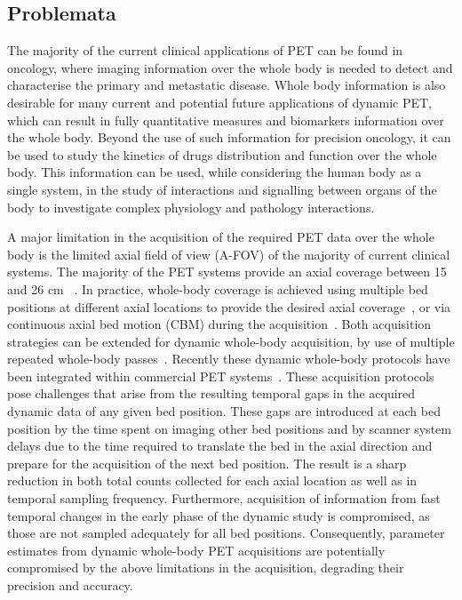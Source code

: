\subsection*{Problemata}
The majority of the current clinical applications of PET can be found in oncology, where imaging information over the whole body is needed to detect and characterise the primary and metastatic disease. 
Whole body information is also desirable for many current and potential future applications of dynamic PET, which can result in fully quantitative measures and biomarkers information over the whole body. Beyond the use of such information for precision oncology, it can be used to study the kinetics of drugs distribution and function over the whole body.
This information can be used, while considering the human body as a single system, in the study of interactions and signalling between organs of the body to investigate complex physiology and pathology interactions.

A major limitation in the acquisition of the required PET data over the whole body is the limited axial field of view (A-FOV) of the majority of current clinical systems. The majority of the PET systems provide an axial coverage between 15 and 26 cm ~\cite{Vandenberghe2020}. 
In practice, whole-body coverage is achieved using multiple bed positions at different axial locations to provide the desired axial coverage~\cite{Schubert1996}, or via continuous axial bed motion (CBM) during the acquisition~\cite{Panin2014}. 
Both acquisition strategies can be extended for dynamic whole-body acquisition, by use of multiple repeated whole-body passes~\cite {Karakatsanis2011,Karakatsanis2013,Rahmim2019}.
Recently these dynamic whole-body protocols have been integrated within commercial PET systems~\cite{Hu2020}. 
These acquisition protocols pose challenges that arise from the resulting temporal gaps in the acquired dynamic data of any given bed position. These gaps are introduced at each bed position by the time spent on imaging other bed positions and by scanner system delays due to the time required to translate the bed in the axial direction and prepare for the acquisition of the next bed position. The result is a sharp reduction in both total counts collected for each axial location as well as in temporal sampling frequency. Furthermore, acquisition of information from fast temporal changes in the early phase of the dynamic study is compromised, as those are not sampled adequately for all bed positions. Consequently, parameter estimates from dynamic whole-body PET acquisitions are potentially compromised by the above limitations in the acquisition, degrading their precision and accuracy.

